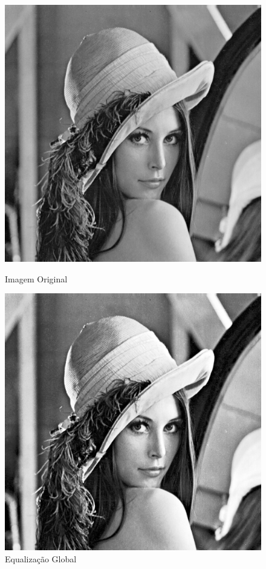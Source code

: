 \documentclass{article}
\begin{document}
\newpage

\begin{figure}[!htb]
\begin{minipage}[b]{0.45\linewidth}
\centering
\includegraphics[scale=0.32]{lena_B.png}
\caption{Imagem Original}
\label{fig:original}
\end{minipage}
\hspace{0.5cm}
\begin{minipage}[b]{0.45\linewidth}
\centering
\includegraphics[scale=0.32]{EqGlobal.png}
\caption{Equalização Global}
\label{fig:rota}
\end{minipage}
\end{figure}
\end{document}
